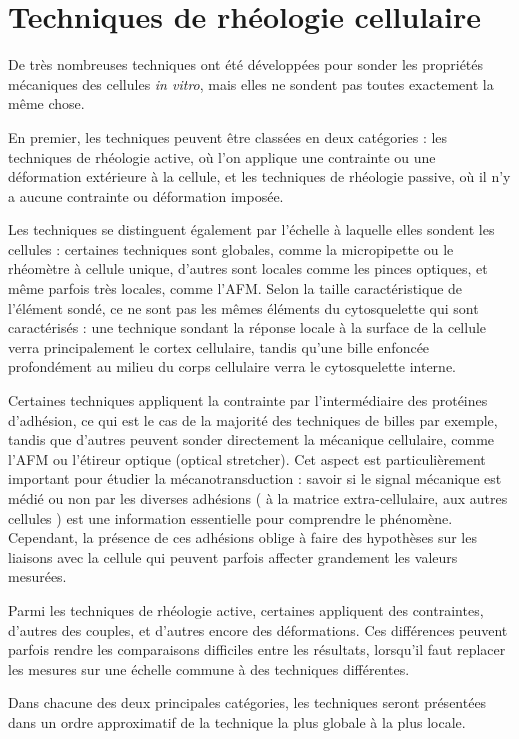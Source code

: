 \section{Techniques de rhéologie cellulaire}

De très nombreuses techniques ont été développées pour sonder les propriétés mécaniques des cellules \textit{in vitro}, mais elles ne sondent pas toutes exactement la même chose. 

En premier, les techniques peuvent être classées en deux catégories : les techniques de rhéologie active, où l'on applique une contrainte ou une déformation extérieure à la cellule, et les techniques de rhéologie passive, où il n'y a aucune contrainte ou déformation imposée. 

Les techniques se distinguent également par l'échelle à laquelle elles sondent les cellules : certaines techniques sont globales, comme la micropipette ou le rhéomètre à cellule unique, d'autres sont locales comme les pinces optiques, et même parfois très locales, comme l'AFM. 
Selon la taille caractéristique de l'élément sondé, ce ne sont pas les mêmes éléments du cytosquelette qui sont caractérisés : une technique sondant la réponse locale à la surface de la cellule verra principalement le cortex cellulaire, tandis qu'une bille enfoncée profondément au milieu du corps cellulaire verra le cytosquelette interne. 

Certaines techniques appliquent la contrainte par l'intermédiaire des protéines d'adhésion, ce qui est le cas de la majorité des techniques de billes par exemple, tandis que d'autres peuvent sonder directement la mécanique cellulaire, comme l'AFM ou l'étireur optique (optical stretcher). Cet aspect est particulièrement important pour étudier la mécanotransduction : savoir si le signal mécanique est médié ou non par les diverses adhésions ( à la matrice extra-cellulaire, aux autres cellules ) est une information essentielle pour comprendre le phénomène. 
Cependant, la présence de ces adhésions oblige à faire des hypothèses sur les liaisons avec la cellule qui peuvent parfois affecter grandement les valeurs mesurées. 

Parmi les techniques de rhéologie active, certaines appliquent des contraintes, d'autres des couples, et d'autres encore des déformations. Ces différences peuvent parfois rendre les comparaisons difficiles entre les résultats, lorsqu'il faut replacer les mesures sur une échelle commune à des techniques différentes. 

Dans chacune des deux principales catégories, les techniques seront présentées dans un ordre approximatif de la technique la plus globale à la plus locale. 


